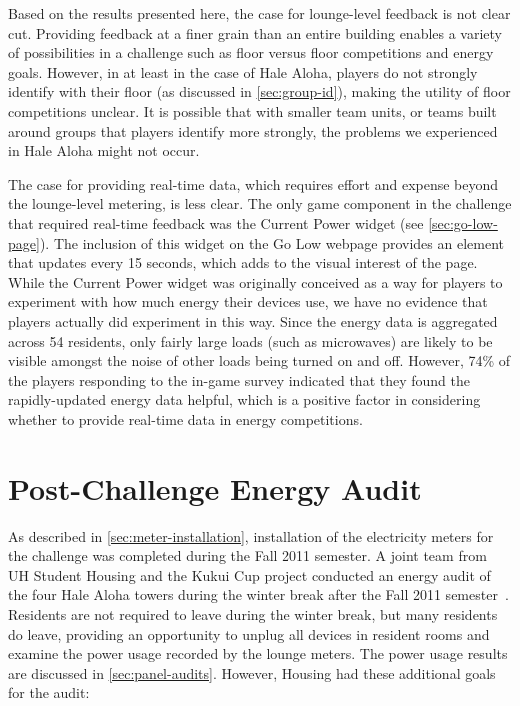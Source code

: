 Based on the results presented here, the case for lounge-level feedback is not clear cut. Providing feedback at a finer grain than an entire building enables a variety of possibilities in a challenge such as floor versus floor competitions and energy goals. However, in at least in the case of Hale Aloha, players do not strongly identify with their floor (as discussed in \autoref{sec:group-id}), making the utility of floor competitions unclear. It is possible that with smaller team units, or teams built around groups that players identify more strongly, the problems we experienced in Hale Aloha might not occur.

The case for providing real-time data, which requires effort and expense beyond the lounge-level metering, is less clear. The only game component in the challenge that required real-time feedback was the Current Power widget (see \autoref{sec:go-low-page}). The inclusion of this widget on the Go Low webpage provides an element that updates every 15 seconds, which adds to the visual interest of the page. While the Current Power widget was originally conceived as a way for players to experiment with how much energy their devices use, we have no evidence that players actually did experiment in this way. Since the energy data is aggregated across 54 residents, only fairly large loads (such as microwaves) are likely to be visible amongst the noise of other loads being turned on and off. However, 74\% of the players responding to the in-game survey indicated that they found the rapidly-updated energy data helpful, which is a positive factor in considering whether to provide real-time data in energy competitions.


\section{Post-Challenge Energy Audit}
\label{sec:post-energy-audit}

As described in \autoref{sec:meter-installation}, installation of the electricity meters for the challenge was completed during the Fall 2011 semester. A joint team from UH \Manoa Student Housing and the Kukui Cup project conducted an energy audit of the four Hale Aloha towers during the winter break after the Fall 2011 semester~\cite{csdl2-11-12}. Residents are not required to leave during the winter break, but many residents do leave, providing an opportunity to unplug all devices in resident rooms and examine the power usage recorded by the lounge meters. The power usage results are discussed in \autoref{sec:panel-audits}. However, Housing had these additional goals for the audit:

